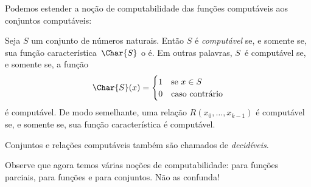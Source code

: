 \documentclass[../../../include/open-logic-section]{subfiles}
\begin{document}

Podemos estender a noção de computabilidade das funções computáveis
aos conjuntos computáveis:

\begin{defn}
  Seja $S$ um conjunto de números naturais. Então $S$ é
  \emph{computável} se, e somente se, sua função
  característica~$\Char{S}$ o é. Em outras palavras, $S$~é computável
  se, e somente se, a função
\[
\Char{S}(x) =
\begin{cases}
1 & \text{se $x \in S$} \\
0 & \text{caso contrário}
\end{cases}
\]
é computável. De modo semelhante, uma relação
$R(x_0, \dots, x_{k-1})$ é computável se, e somente se, sua função
característica é computável.

Conjuntos e relações computáveis também são chamados de
\emph{decidíveis}.
\end{defn}

\begin{explain}
Observe que agora temos várias noções de computabilidade: para funções
parciais, para funções e para conjuntos. Não as confunda!{}
\end{explain}
\end{document}
